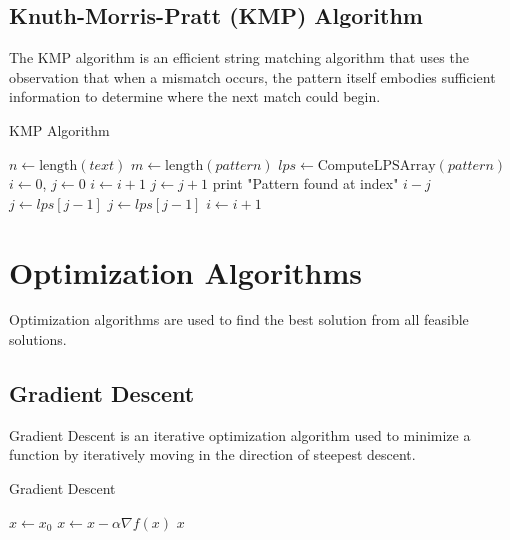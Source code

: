 \subsection{Knuth-Morris-Pratt (KMP) Algorithm}

The KMP algorithm is an efficient string matching algorithm that uses
the observation that when a mismatch occurs, the pattern itself embodies
sufficient information to determine where the next match could begin.

\begin{algorithm}
\caption{KMP Algorithm}
\begin{algorithmic}
    \STATE $n \gets \text{length}(text)$
    \STATE $m \gets \text{length}(pattern)$
    \STATE $lps \gets \text{ComputeLPSArray}(pattern)$
    \STATE $i \gets 0$, $j \gets 0$
            \STATE $i \gets i + 1$
            \STATE $j \gets j + 1$
        \ENDIF
            \STATE print "Pattern found at index" $i-j$
            \STATE $j \gets lps[j-1]$
                \STATE $j \gets lps[j-1]$
            \ELSE
                \STATE $i \gets i + 1$
            \ENDIF
        \ENDIF
    \ENDWHILE
\ENDPROCEDURE
\end{algorithmic}
\end{algorithm}

\section{Optimization Algorithms}

Optimization algorithms are used to find the best solution from all
feasible solutions.

\subsection{Gradient Descent}

Gradient Descent is an iterative optimization algorithm used to minimize
a function by iteratively moving in the direction of steepest descent.

\begin{algorithm}
\caption{Gradient Descent}
\begin{algorithmic}
    \STATE $x \gets x_0$
        \STATE $x \gets x - \alpha \nabla f(x)$
    \ENDWHILE
    \RETURN $x$
\ENDPROCEDURE
\end{algorithmic}
\end{algorithm}

